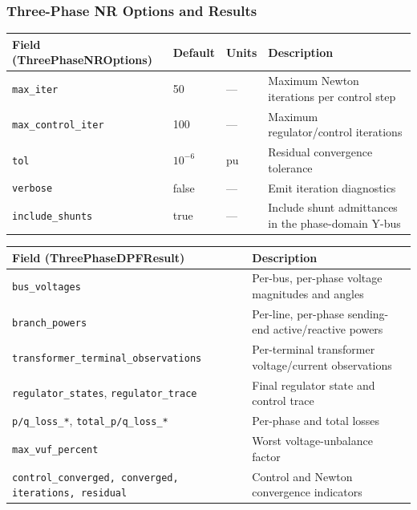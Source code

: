 \subsubsection{Three-Phase NR Options and Results}

\begin{center}
\begin{tabular}{llll}
\hline\hline
\textbf{Field (ThreePhaseNROptions)} & \textbf{Default} & \textbf{Units} & \textbf{Description} \\
\hline
\texttt{max\_iter} & 50 & --- & Maximum Newton iterations per control step \\
\texttt{max\_control\_iter} & 100 & --- & Maximum regulator/control iterations \\
\texttt{tol} & \(10^{-6}\) & pu & Residual convergence tolerance \\
\texttt{verbose} & false & --- & Emit iteration diagnostics \\
\texttt{include\_shunts} & true & --- & Include shunt admittances in the phase-domain Y-bus \\
\hline\hline
\end{tabular}
\end{center}

\begin{center}
\begin{tabular}{ll}
\hline\hline
\textbf{Field (ThreePhaseDPFResult)} & \textbf{Description} \\
\hline
\texttt{bus\_voltages} & Per-bus, per-phase voltage magnitudes and angles \\
\texttt{branch\_powers} & Per-line, per-phase sending-end active/reactive powers \\
\texttt{transformer\_terminal\_observations} & Per-terminal transformer voltage/current observations \\
\texttt{regulator\_states}, \texttt{regulator\_trace} & Final regulator state and control trace \\
\texttt{p/q\_loss\_*}, \texttt{total\_p/q\_loss\_*} & Per-phase and total losses \\
\texttt{max\_vuf\_percent} & Worst voltage-unbalance factor \\
\texttt{control\_converged, converged, iterations, residual} & Control and Newton convergence indicators \\
\hline\hline
\end{tabular}
\end{center}

